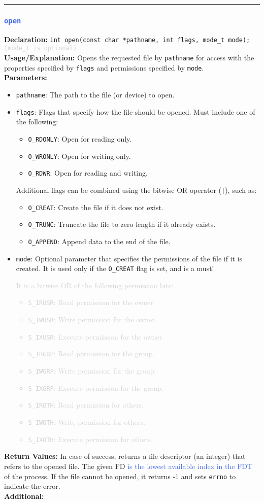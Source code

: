 \documentclass[openany,12pt]{book}
\newcommand{\code}[1]{\texttt{#1}}
\newcommand{\blue}[1]{\textcolor{RoyalBlue}{#1}}
\newcommand{\gray}[1]{\textcolor{lightgray}{#1}}
\newcommand{\functionEntryPar}[6]{%
  \noindent\rule{\linewidth}{0.5pt}
  \subsubsection*{\blue{\large{\texttt{#1}}}}
  \textbf{Declaration:} \texttt{#2} \\
  \textbf{Usage/Explanation:} #3 \\
  \textbf{Parameters:}
  \begin{itemize}[leftmargin=*]
    #4
  \end{itemize}
  \textbf{Return Values:} #5 \\
  \textbf{Additional:} #6
  \vspace{1em}
}
\begin{document}
\functionEntryPar{open}
{int open(const char *pathname, int flags, mode\_t mode); \gray{(mode\_t is optional)}}
{Opens the requested file by \code{pathname} for access with the properties specified by \code{flags} and permissions specified by \code{mode}.}
{\item \code{pathname}: The path to the file (or device) to open.
  \item \code{flags}: Flags that specify how the file should be opened. Must include one of the following:
  \begin{itemize}[leftmargin=*]
    \item \code{O\_RDONLY}: Open for reading only.
    \item \code{O\_WRONLY}: Open for writing only.
    \item \code{O\_RDWR}: Open for reading and writing.
  \end{itemize}
  Additional flags can be combined using the bitwise OR operator (\code{|}), such as:
  \begin{itemize}[leftmargin=*]
    \item \code{O\_CREAT}: Create the file if it does not exist.
    \item \code{O\_TRUNC}: Truncate the file to zero length if it already exists.
    \item \code{O\_APPEND}: Append data to the end of the file.
  \end{itemize}

  \item \code{mode}: Optional parameter that specifies the permissions of the file if it is created. It is used only if the \code{O\_CREAT} flag is set, and is a must!
  \gray{
    It is a bitwise OR of the following permission bits:
    \begin{itemize}[leftmargin=*]
      \item \code{S\_IRUSR}: Read permission for the owner.
      \item \code{S\_IWUSR}: Write permission for the owner.
      \item \code{S\_IXUSR}: Execute permission for the owner.
      \item \code{S\_IRGRP}: Read permission for the group.
      \item \code{S\_IWGRP}: Write permission for the group.
      \item \code{S\_IXGRP}: Execute permission for the group.
      \item \code{S\_IROTH}: Read permission for others.
      \item \code{S\_IWOTH}: Write permission for others.
      \item \code{S\_IXOTH}: Execute permission for others.
    \end{itemize}
  }
}
{In case of success, returns a file descriptor (an integer) that refers to the opened file. The given FD \blue{is the lowest available index in the FDT} of the process. If the file cannot be opened, it returns -1 and sets \code{errno} to indicate the error.}
{\label{func:open}}
\end{document}
